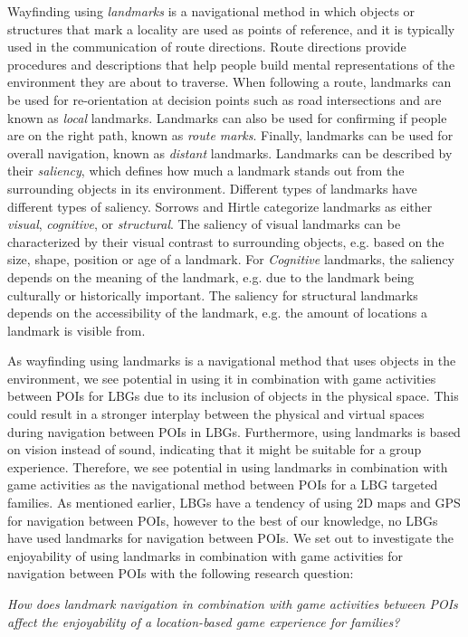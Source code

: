 Wayfinding using \textit{landmarks} is a navigational method in which objects or structures that mark a locality are used as points of reference, and it is typically used in the communication of route directions\cite{landmarks}. Route directions provide procedures and descriptions that help people build mental representations of the environment they are about to traverse. When following a route, landmarks can be used for re-orientation at decision points such as road intersections and are known as \textit{local} landmarks. Landmarks can also be used for confirming if people are on the right path, known as \textit{route marks}. Finally, landmarks can be used for overall navigation, known as \textit{distant} landmarks. Landmarks can be described by their \textit{saliency}, which defines how much a landmark stands out from the surrounding objects in its environment. Different types of landmarks have different types of saliency. Sorrows and Hirtle categorize landmarks as either \textit{visual}, \textit{cognitive}, or \textit{structural}\cite{landmarksChar}. The saliency of visual landmarks can be characterized by their visual contrast to surrounding objects, e.g. based on the size, shape, position or age of a landmark. For \textit{Cognitive} landmarks, the saliency depends on the meaning of the landmark, e.g. due to the landmark being culturally or historically important. The saliency for structural landmarks depends on the accessibility of the landmark, e.g. the amount of locations a landmark is visible from.  

As wayfinding using landmarks is a navigational method that uses objects in the environment, we see potential in using it in combination with game activities between POIs for LBGs due to its inclusion of objects in the physical space. This could result in a stronger interplay between the physical and virtual spaces during navigation between POIs in LBGs. Furthermore, using landmarks is based on vision instead of sound, indicating that it might be suitable for a group experience. Therefore, we see potential in using landmarks in combination with game activities as the navigational method between POIs for a LBG targeted families. As mentioned earlier, LBGs have a tendency of using 2D maps and GPS for navigation between POIs, however to the best of our knowledge, no LBGs have used landmarks for navigation between POIs. We set out to investigate the enjoyability of using landmarks in combination with game activities for navigation between POIs with the following research question:

\emph{How does landmark navigation in combination with game activities between POIs affect the enjoyability of a location-based game experience for families?}


